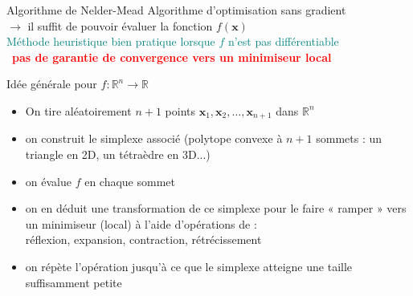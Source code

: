 \documentclass[9pt,table]{beamer} %
\newcommand{\cmark}{\ding{51}}%
\newcommand{\xmark}{\ding{55}}%
\begin{document}
\begin{frame}{Algorithme de Nelder-Mead}
  Algorithme d'optimisation sans gradient\\
  $\rightarrow$ il suffit de pouvoir évaluer la fonction $f(\mathbf{x})$\\[1em]

\textcolor{teal}{\cmark\: Méthode heuristique bien pratique lorsque $f$ n'est pas différentiable}\\
\textcolor{red}{\xmark\:\, \bf pas de garantie de convergence vers un minimiseur local}
\bigskip

\alert{Idée générale} pour $f: \mathbb{R}^n \rightarrow \mathbb{R}$

\begin{itemize}
  \item[1.] On tire aléatoirement $n+1$ points $ \mathbf{x}_1, \mathbf{x}_2, \ldots, \mathbf{x}_{n+1}$ dans $\mathbb{R}^{n}$\pause
  \item[2.] on construit le simplexe associé (polytope convexe à $n+1$ sommets : un triangle en 2D, un tétraèdre en 3D...)\pause
  \item[3.] on évalue $f$ en chaque sommet\pause
  \item[4.] on en déduit une transformation de ce simplexe pour le faire « ramper » vers un minimiseur (local) à l'aide d'opérations de : \\ 
  réflexion, expansion, contraction, rétrécissement\pause
  \item[5.] on répète l'opération jusqu'à ce que le simplexe atteigne une taille suffisamment petite
\end{itemize}

\end{frame}
\end{document}
